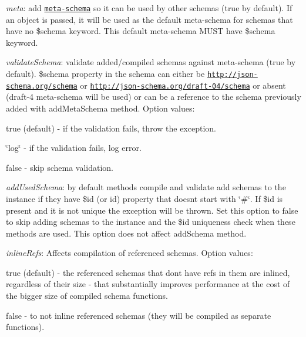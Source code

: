 \begin{DoxyItemize}
\item {\itshape meta}\+: add \href{http://json-schema.org/documentation.html}{\tt meta-\/schema} so it can be used by other schemas (true by default). If an object is passed, it will be used as the default meta-\/schema for schemas that have no {\ttfamily \$schema} keyword. This default meta-\/schema M\+U\+ST have {\ttfamily \$schema} keyword.
\item {\itshape validate\+Schema}\+: validate added/compiled schemas against meta-\/schema (true by default). {\ttfamily \$schema} property in the schema can either be \href{http://json-schema.org/schema}{\tt http\+://json-\/schema.\+org/schema} or \href{http://json-schema.org/draft-04/schema}{\tt http\+://json-\/schema.\+org/draft-\/04/schema} or absent (draft-\/4 meta-\/schema will be used) or can be a reference to the schema previously added with {\ttfamily add\+Meta\+Schema} method. Option values\+:
\begin{DoxyItemize}
\item {\ttfamily true} (default) -\/ if the validation fails, throw the exception.
\item {\ttfamily \char`\"{}log\char`\"{}} -\/ if the validation fails, log error.
\item {\ttfamily false} -\/ skip schema validation.
\end{DoxyItemize}
\item {\itshape add\+Used\+Schema}\+: by default methods {\ttfamily compile} and {\ttfamily validate} add schemas to the instance if they have {\ttfamily \$id} (or {\ttfamily id}) property that doesn\textquotesingle{}t start with \char`\"{}\#\char`\"{}. If {\ttfamily \$id} is present and it is not unique the exception will be thrown. Set this option to {\ttfamily false} to skip adding schemas to the instance and the {\ttfamily \$id} uniqueness check when these methods are used. This option does not affect {\ttfamily add\+Schema} method.
\item {\itshape inline\+Refs}\+: Affects compilation of referenced schemas. Option values\+:
\begin{DoxyItemize}
\item {\ttfamily true} (default) -\/ the referenced schemas that don\textquotesingle{}t have refs in them are inlined, regardless of their size -\/ that substantially improves performance at the cost of the bigger size of compiled schema functions.
\item {\ttfamily false} -\/ to not inline referenced schemas (they will be compiled as separate functions).

\end{DoxyItemize}
\end{DoxyItemize}
